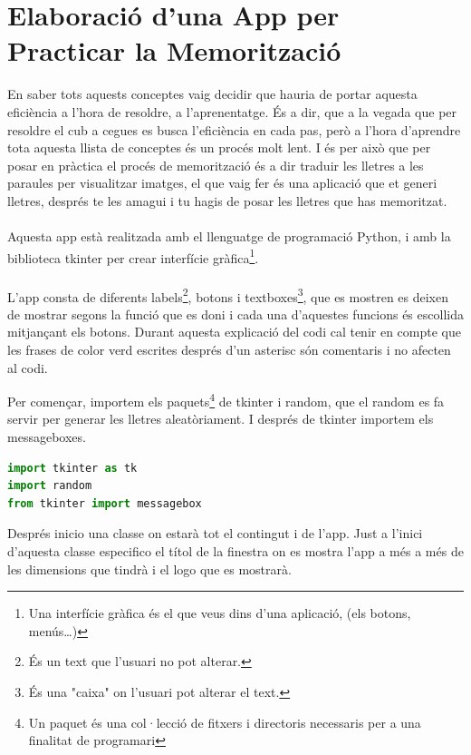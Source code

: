 \chapter{Elaboració d'una App per Practicar la Memorització}
\label{cha:python}

En saber tots aquests conceptes vaig decidir que hauria de portar aquesta eficiència a l'hora
de resoldre, a l'aprenentatge. És a dir, que a la vegada que per resoldre el cub a cegues es
busca l'eficiència en cada pas, però a l'hora d'aprendre tota aquesta llista de conceptes és un
procés molt lent. I és per això que per posar en pràctica el procés de memorització és a dir traduir les lletres a les paraules per visualitzar imatges, el que vaig fer és una aplicació que et
generi lletres, després te les amagui i tu hagis de posar les lletres que has memoritzat.
\\\\Aquesta app està realitzada amb el llenguatge de programació Python, i amb la biblioteca tkinter per crear interfície gràfica\footnote{Una interfície gràfica és el que veus dins d'una aplicació, (els botons, menús\dots)}.
\\\\L'app consta de diferents labels\footnote{És un text que l'usuari no pot alterar.}, botons i textboxes\footnote{És una "caixa" on l'usuari pot alterar el text.}, que es mostren es deixen de mostrar segons la funció que es doni i cada una d'aquestes funcions és escollida mitjançant els botons. Durant aquesta explicació del codi cal tenir en compte que les frases de color verd escrites després d'un asterisc són comentaris i no afecten al codi.

\vspace{0.5cm}

Per començar, importem els paquets\footnote{Un paquet és una col·lecció de fitxers i directoris necessaris per a una finalitat de programari} de tkinter i random, que el random es fa servir per generar les lletres aleatòriament. I després de tkinter importem els messageboxes.

\begin{lstlisting}[language=Python, style=colorEX, caption=Importació de paquets]
import tkinter as tk
import random
from tkinter import messagebox
\end{lstlisting}

Després inicio una classe on estarà tot el contingut i de l'app. Just a l'inici d'aquesta classe
especifico el títol de la finestra on es mostra l'app a més a més de les dimensions que tindrà i
el logo que es mostrarà.

